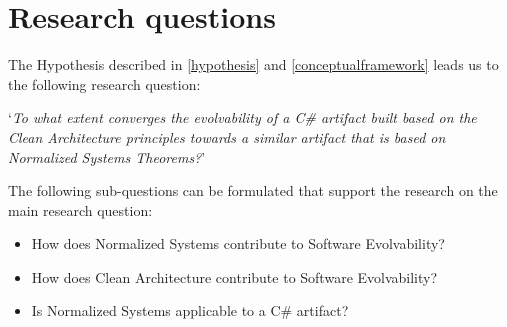 \section{Research questions} \label{research_questions}
The Hypothesis described in \ref{hypothesis} and \ref{conceptualframework} leads us to the
following research question:

\begin{center}
    \enquote*{\textit{To what extent converges the evolvability of a C\# artifact built
    based on the Clean Architecture principles towards a similar artifact that is based on
    Normalized Systems Theorems?}}
\end{center}

The following sub-questions can be formulated that support the research on the main
research question:
\begin{itemize}
    \item How does Normalized Systems contribute to Software Evolvability?
    \item How does Clean Architecture contribute to Software Evolvability?
    \item Is Normalized Systems applicable to a C\# artifact?   
\end{itemize}